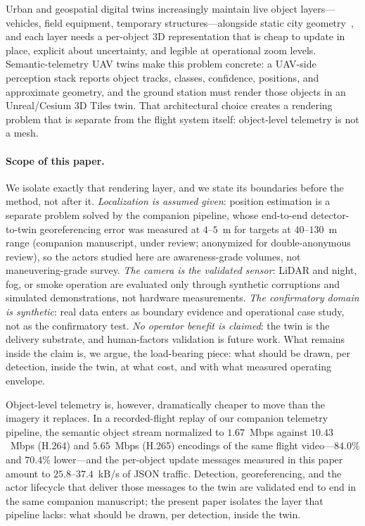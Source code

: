 \documentclass[11pt,a4paper]{article}
\begin{document}
Urban and geospatial digital twins increasingly maintain live object
layers---vehicles, field equipment, temporary structures---alongside static
city geometry~\cite{batty2018digitaltwins,ogc2023tiles}, and each layer
needs a per-object 3D representation that is cheap to update in place,
explicit about uncertainty, and legible at operational zoom levels.
Semantic-telemetry UAV twins make this problem concrete: a UAV-side
perception stack reports object tracks, classes, confidence, positions, and
approximate geometry, and the ground station must render those objects in an
Unreal/Cesium 3D Tiles twin. That architectural choice creates a rendering
problem that is separate from the flight system itself: object-level telemetry
is not a mesh.

\paragraph{Scope of this paper.} We isolate exactly that rendering layer, and
we state its boundaries before the method, not after it. \emph{Localization
is assumed given}: position estimation is a separate problem solved by the
companion pipeline, whose end-to-end detector-to-twin georeferencing error
was measured at \(4\)--\(5\)~m for targets at \(40\)--\(130\)~m range (companion
manuscript, under review; anonymized for double-anonymous review), so
the actors studied here are awareness-grade volumes, not maneuvering-grade
survey. \emph{The camera is the validated sensor}: LiDAR and night, fog, or
smoke operation are evaluated only through synthetic corruptions and
simulated demonstrations, not hardware measurements. \emph{The confirmatory
domain is synthetic}: real data enters as boundary evidence and operational
case study, not as the confirmatory test. \emph{No operator benefit is
claimed}: the twin is the delivery substrate, and human-factors validation
is future work. What remains inside the claim is, we argue, the load-bearing
piece: what should be drawn, per detection, inside the twin, at what cost,
and with what measured operating envelope.

Object-level telemetry is, however, dramatically cheaper to move than the
imagery it replaces. In a recorded-flight replay of our companion telemetry
pipeline, the semantic object stream normalized to \(1.67\)~Mbps against
\(10.43\)~Mbps (H.264) and \(5.65\)~Mbps (H.265) encodings of the same
flight video---\(84.0\)\% and \(70.4\)\% lower---and the per-object update
messages measured in this paper amount to \(25.8\)--\(37.4\)~kB/s of JSON
traffic. Detection, georeferencing, and the actor lifecycle that deliver
those messages to the
twin are validated end to end in the same companion manuscript; the
present paper isolates the layer that pipeline lacks: what should be drawn,
per detection, inside the twin.
\end{document}
